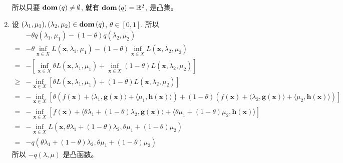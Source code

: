 \documentclass[11pt,letter,notitlepage]{article}
\DeclareMathOperator*{\dom}{\bf dom\,}
\begin{document}
\begin{solution}
\begin{enumerate}
		      所以只要 $\dom (q) \neq \emptyset$, 就有 $\dom (q)=\mathbb{R}^2$, 是凸集。
		\item 设 $(\lambda_1,\mu_1), (\lambda_2,\mu_2) \in \dom (q)$, $\theta \in [0,1]$.
		      所以
		      $$\begin{aligned}
				           & -\theta q(\lambda_1,\mu_1) - (1-\theta) q(\lambda_2,\mu_2)                                                                                                                                                                                                                                                                   \\
				      =    & -\theta \inf_{\mathbf{x}\in X} L(\mathbf{x},\lambda_1,\mu_1) - (1-\theta) \inf_{\mathbf{x}\in X} L(\mathbf{x},\lambda_2,\mu_2)                                                                                                                                                                                               \\
				      =    & -\left[ \inf_{\mathbf{x}\in X} \theta L(\mathbf{x},\lambda_1,\mu_1) + \inf_{\mathbf{x}\in X} (1-\theta) L(\mathbf{x},\lambda_2,\mu_2) \right]                                                                                                                                                                                \\
				      \geq & -\inf_{\mathbf{x}\in X} \left[ \theta L(\mathbf{x},\lambda_1,\mu_1) +(1-\theta) L(\mathbf{x},\lambda_2,\mu_2)\right]                                                                                                                                                                                                         \\
				      =    & -\inf_{\mathbf{x}\in X} \left[ \theta \left( f(\mathbf{x}) + \langle \lambda_1, \mathbf{g}(\mathbf{x}) \rangle + \langle \mu_1, \mathbf{h}(\mathbf{x}) \rangle \right) + (1-\theta) \left( f(\mathbf{x}) + \langle \lambda_2, \mathbf{g}(\mathbf{x}) \rangle + \langle \mu_2, \mathbf{h}(\mathbf{x}) \rangle \right) \right] \\
				      =    & -\inf_{\mathbf{x}\in X} \left[ f(\mathbf{x}) + \langle \theta\lambda_1+(1-\theta)\lambda_2, \mathbf{g}(\mathbf{x}) \rangle + \langle \theta\mu_1+(1-\theta)\mu_2, \mathbf{h}(\mathbf{x}) \rangle  \right]                                                                                                                    \\
				      =    & -\inf_{\mathbf{x}\in X} L(\mathbf{x},\theta\lambda_1+(1-\theta)\lambda_2,\theta\mu_1+(1-\theta)\mu_2)                                                                                                                                                                                                                        \\
				      =    & -q (\theta\lambda_1+(1-\theta)\lambda_2,\theta\mu_1+(1-\theta)\mu_2)
			      \end{aligned}$$
		      所以 $-q(\lambda,\mu)$ 是凸函数。
	\end{enumerate}
\end{solution}
\end{document}
